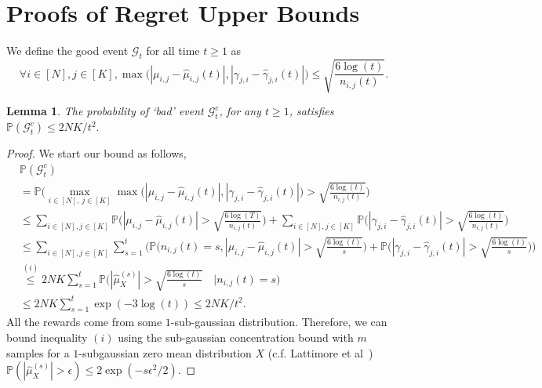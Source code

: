 \documentclass{article}
\newtheorem{lemma}[theorem]{Lemma}
\begin{document}



\section{Proofs of Regret Upper Bounds}


We define the good event $\mathcal{G}_t$ for all time $t\geq 1$ as
$$
\forall i \in [N], j\in [K], \max\Big(|\mu_{i,j} - \hat{\mu}_{i,j}(t)|, |\gamma_{j,i} - \hat{\gamma}_{j,i}(t)| \Big) \leq \sqrt{\frac{6\log(t)}{n_{i,j}(t)}}.
$$
\begin{lemma}\label{lemm:bad-event-prob}
 The probability of `bad' event $\mathcal{G}^c_t$, for any $t \geq 1$, satisfies 
$
\mathbb{P}(\mathcal{G}^c_t) \leq 2 NK / t^2. 
$
\end{lemma}
\begin{proof}
We start our bound as follows,
\begin{align*}
  &\mathbb{P}(\mathcal{G}^c_t) \\
  &= \mathbb{P}\Big(\max_{i\in [N],\, j\in [K]} \max\Big(|\mu_{i,j} - \hat{\mu}_{i,j}(t)|, |\gamma_{j,i} - \hat{\gamma}_{j,i}(t)| \Big) > \sqrt{\frac{6\log(t)}{n_{i,j}(t)}}\Big) \\
  &\leq \sum_{i\in [N], j\in [K]} \mathbb{P}\Big(|\mu_{i,j} - \hat{\mu}_{i,j}(t)| > \sqrt{\frac{6\log(T)}{n_{i,j}(t)}} \Big) + \sum_{i\in [N], j\in [K]} \mathbb{P}\Big( |\gamma_{j,i} - \hat{\gamma}_{j,i}(t)| > \sqrt{\frac{6\log(t)}{n_{i,j}(t)}} \Big)\\
  &\leq \sum_{i\in [N], j\in [K]} \sum_{s=1}^{t}\Big(\mathbb{P}\Big(n_{i,j}(t) = s, |\mu_{i,j} - \hat{\mu}_{i,j}(t)| > \sqrt{\frac{6\log(t)}{s}}\Big) + \mathbb{P}\Big( |\gamma_{j,i} - \hat{\gamma}_{j,i}(t)| > \sqrt{\frac{6\log(t)}{s}} \Big)\Big)\\
&\overset{(i)}{\leq} 2 NK\sum_{s=1}^{t}\mathbb{P}\Big(|\hat{\mu}^{(s)}_{X}| > \sqrt{\frac{6\log(t)}{s}} \quad \Big\vert n_{i,j}(t) = s\Big)\\
&\leq 2 NK \sum_{s=1}^{t}\exp(- 3\log(t))
\leq 2 NK / t^{2}.  
\end{align*}
All the rewards come from some $1$-sub-gaussian distribution. Therefore, we can bound inequality $(i)$ using the sub-gaussian concentration bound with $m$ samples for a $1$-subgaussian zero mean distribution $X$    (c.f. Lattimore et al~\cite{})
$
\mathbb{P}(|\hat{\mu}^{(s)}_{X}| > \epsilon) \leq 2\exp(- s\epsilon^2 / 2).
$
\end{proof}
\end{document}
